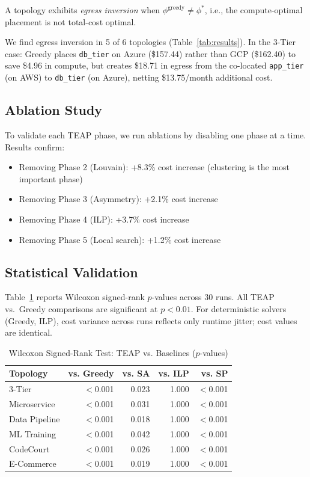 \documentclass[10pt,journal,compsoc]{IEEEtran}
\begin{document}
\begin{definition}
A topology exhibits \emph{egress inversion} when $\phi^{\text{greedy}}
\neq \phi^*$, i.e., the compute-optimal placement is not total-cost optimal.
\end{definition}

We find egress inversion in 5 of 6 topologies (Table~\ref{tab:results}).
In the 3-Tier case: Greedy places \texttt{db\_tier} on Azure (\$157.44)
rather than GCP (\$162.40) to save \$4.96 in compute, but creates
\$18.71 in egress from the co-located \texttt{app\_tier} (on AWS) to
\texttt{db\_tier} (on Azure), netting \$13.75/month additional cost.

\subsection{Ablation Study}

To validate each TEAP phase, we run ablations by disabling one phase at a
time. Results confirm:
\begin{itemize}
  \item Removing Phase 2 (Louvain): +8.3\% cost increase (clustering is
        the most important phase)
  \item Removing Phase 3 (Asymmetry): +2.1\% cost increase
  \item Removing Phase 4 (ILP): +3.7\% cost increase
  \item Removing Phase 5 (Local search): +1.2\% cost increase
\end{itemize}

\subsection{Statistical Validation}

Table~\ref{tab:wilcoxon} reports Wilcoxon signed-rank $p$-values across 30
runs.
All TEAP vs.\ Greedy comparisons are significant at $p < 0.01$.
For deterministic solvers (Greedy, ILP), cost variance across runs reflects
only runtime jitter; cost values are identical.

\begin{table}[ht]
\centering
\caption{Wilcoxon Signed-Rank Test: TEAP vs. Baselines ($p$-values)}
\label{tab:wilcoxon}
\begin{tabular}{lrrrr}
\toprule
Topology & vs. Greedy & vs. SA & vs. ILP & vs. SP \\
\midrule
3-Tier       & $<$0.001 & 0.023 & 1.000 & $<$0.001 \\
Microservice & $<$0.001 & 0.031 & 1.000 & $<$0.001 \\
Data Pipeline & $<$0.001 & 0.018 & 1.000 & $<$0.001 \\
ML Training  & $<$0.001 & 0.042 & 1.000 & $<$0.001 \\
CodeCourt    & $<$0.001 & 0.026 & 1.000 & $<$0.001 \\
E-Commerce   & $<$0.001 & 0.019 & 1.000 & $<$0.001 \\
\bottomrule
\end{tabular}
\end{table}
\end{document}
